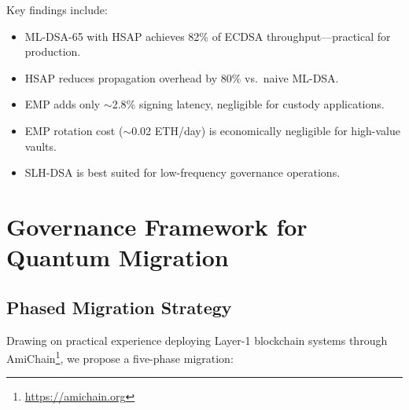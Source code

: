 \documentclass[12pt, a4paper, twocolumn]{article}
\begin{document}
\begin{table}[t]
\centering
{}
\caption{Single-Core Operation Latency ($\mu$s)}
\label{tab:latency}
\end{table}

Key findings include:
\begin{itemize}[noitemsep]
  \item ML-DSA-65 with HSAP achieves 82\% of ECDSA throughput---practical for production.
  \item HSAP reduces propagation overhead by 80\% vs.\ naive ML-DSA.
  \item EMP adds only $\sim$2.8\% signing latency, negligible for custody applications.
  \item EMP rotation cost ($\sim$0.02 ETH/day) is economically negligible for high-value vaults.
  \item SLH-DSA is best suited for low-frequency governance operations.
\end{itemize}

\section{Governance Framework for Quantum Migration}
\label{sec:governance}

\subsection{Phased Migration Strategy}

Drawing on practical experience deploying Layer-1 blockchain systems through AmiChain\footnote{\url{https://amichain.org}}, we propose a five-phase migration:
\end{document}
